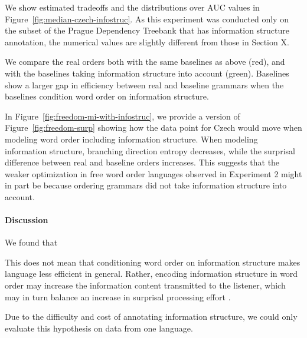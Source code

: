 We show estimated tradeoffs and the distributions over AUC values in Figure~\ref{fig:median-czech-infostruc}.
As this experiment was conducted only on the subset of the Prague Dependency Treebank that has information structure annotation, the numerical values are slightly different from those in Section X.

We compare the real orders both with the same baselines as above (red), and with the baselines taking information structure into account (green).
Baselines show a larger gap in efficiency between real and baseline grammars when the baselines condition word order on information structure.




In Figure~\ref{fig:freedom-mi-with-infostruc}, we provide a version of Figure~\ref{fig:freedom-surp} showing how the data point for Czech would move when modeling word order including information structure.
When modeling information structure, branching direction entropy decreases, while the surprisal difference between real and baseline orders increases.
This suggests that the weaker optimization in free word order languages observed in Experiment 2 might in part be because ordering grammars did not take information structure into account.
	
\paragraph{Discussion}
We found that 
	
This does not mean that conditioning word order on information structure makes language less efficient in general.
Rather, encoding information structure in word order may increase the information content transmitted to the listener, which may in turn balance an increase in surprisal processing effort \citep{hahn2020universals}.

Due to the difficulty and cost of annotating information structure, we could only evaluate this hypothesis on data from one language.


